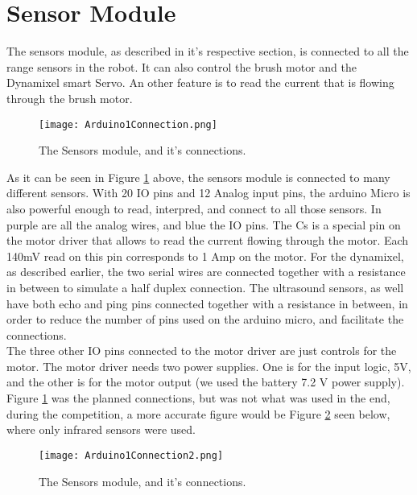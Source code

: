 \section{Sensor Module}

The sensors module, as described in it's respective section, is connected to all the range sensors in the robot. It can also control the brush motor and the Dynamixel smart Servo. An other feature is to read the current that is flowing through the brush motor.

\begin{figure}[H]
  \centering
  \texttt{[image: Arduino1Connection.png]}
  \caption{The Sensors module, and it's connections.}
\label{fig:ard1connection}
\end{figure}

As it can be seen in Figure \ref{fig:ard1connection} above, the sensors module is connected to many different sensors. With 20 IO pins and 12 Analog input pins, the arduino Micro is also powerful enough to read, interpred, and connect to all those sensors. In purple are all the analog wires, and blue the IO pins. The Cs is a special pin on the motor driver that allows to read the current flowing through the motor. Each 140mV read on this pin corresponds to 1 Amp on the motor. For the dynamixel, as described earlier, the two serial wires are connected together with a resistance in between to simulate a half duplex connection. The ultrasound sensors, as well have both echo and ping pins connected together with a resistance in between, in order to reduce the number of pins used on the arduino micro, and facilitate the connections.\\

The three other IO pins connected to the motor driver are just controls for the motor. The motor driver needs two power supplies. One is for the input logic, 5V, and the other is for the motor output (we used the battery 7.2 V power supply).\\

Figure \ref{fig:ard1connection} was the planned connections, but was not what was used in the end, during the competition, a more accurate figure would be Figure \ref{fig:ard1connection2} seen below, where only infrared sensors were used.

\begin{figure}[H]
  \centering
  \texttt{[image: Arduino1Connection2.png]}
  \caption{The Sensors module, and it's connections.}
\label{fig:ard1connection2}
\end{figure}

